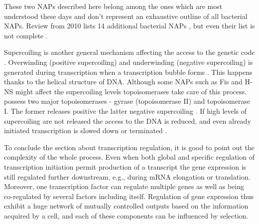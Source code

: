 These two NAPs described here belong among the ones which are most understood these days and don't represent an exhaustive outline of all bacterial NAPs.
Review from 2010 lists 14 additional bacterial NAPs \cite{dillon2010bacterial}, but even their list is not complete \cite{aznar2013hha}.

Supercoiling is another general mechanism affecting the access to the genetic code \cite{brahms1985activation}.
Overwinding (positive supercoiling) and underwinding (negative supercoiling) is generated during transcription when a transcription bubble forms \cite{wu1988transcription}.
This happens thanks to the helical structure of DNA.
Although some NAPs such as Fis and H-NS might affect the supercoiling levels \cite{ouafa2012nucleoid} topoisomerases take care of this process.
 possess two major topoisomerases - gyrase (topoisomerase II) and topoisomerase I.
The former releases positive the latter negative supercoiling \cite{wang1971interaction, gellert1976dna}.
If high levels of supercoiling are not released the access to the DNA is reduced, and even already initiated transcription is slowed down or terminated \cite{chong2014mechanism}.

To conclude the section about transcription regulation, it is good to point out the complexity of the whole process.
Even when both global and specific regulation of transcription initiation permit production of a transcript the gene expression is still regulated further downstream, e.g., during mRNA elongation or translation.
Moreover, one transcription factor can regulate multiple genes as well as being co-regulated by several factors including itself.
Regulation of gene expression thus exhibit a huge network of mutually controlled outputs based on the information acquired by a cell, and each of these components can be influenced by selection.



